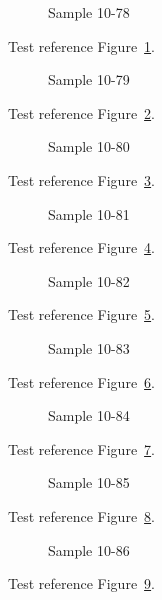 \begin{figure}[tbhp]
\caption{Sample 10-78}
\label{fig:sample-10-78}
\end{figure}

Test reference Figure~\ref{fig:sample-10-78}.

\begin{figure}[tbhp]
\caption{Sample 10-79}
\label{fig:sample-10-79}
\end{figure}

Test reference Figure~\ref{fig:sample-10-79}.

\begin{figure}[tbhp]
\caption{Sample 10-80}
\label{fig:sample-10-80}
\end{figure}

Test reference Figure~\ref{fig:sample-10-80}.

\begin{figure}[tbhp]
\caption{Sample 10-81}
\label{fig:sample-10-81}
\end{figure}

Test reference Figure~\ref{fig:sample-10-81}.

\begin{figure}[tbhp]
\caption{Sample 10-82}
\label{fig:sample-10-82}
\end{figure}

Test reference Figure~\ref{fig:sample-10-82}.

\begin{figure}[tbhp]
\caption{Sample 10-83}
\label{fig:sample-10-83}
\end{figure}

Test reference Figure~\ref{fig:sample-10-83}.

\begin{figure}[tbhp]
\caption{Sample 10-84}
\label{fig:sample-10-84}
\end{figure}

Test reference Figure~\ref{fig:sample-10-84}.

\begin{figure}[tbhp]
\caption{Sample 10-85}
\label{fig:sample-10-85}
\end{figure}

Test reference Figure~\ref{fig:sample-10-85}.

\begin{figure}[tbhp]
\caption{Sample 10-86}
\label{fig:sample-10-86}
\end{figure}

Test reference Figure~\ref{fig:sample-10-86}.

